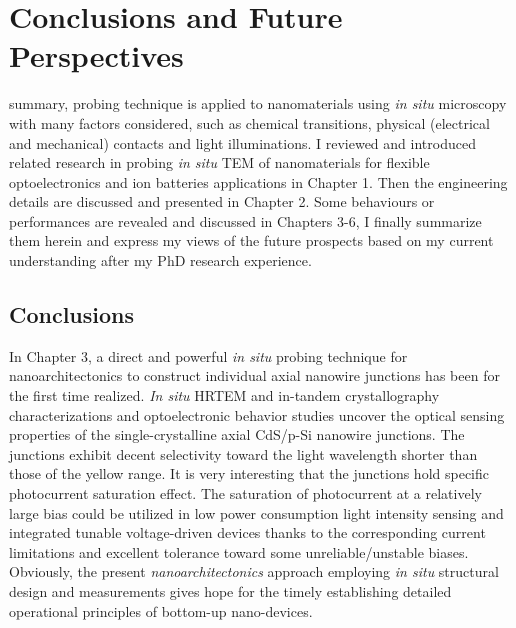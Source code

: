 

\chapter{Conclusions and Future Perspectives}

 summary, probing technique is applied to nanomaterials using \emph{in situ} microscopy with many factors considered, such as chemical transitions, physical (electrical and mechanical) contacts and light illuminations. 
I reviewed and introduced related research in probing {\it in situ} TEM of nanomaterials for flexible optoelectronics and ion batteries applications in Chapter 1. 
Then the engineering details are discussed and presented in Chapter 2. 
Some behaviours or performances are revealed and discussed in Chapters 3-6, I finally summarize them herein and express my views of the future prospects based on my current understanding after my PhD research experience. 

\section{Conclusions}
In Chapter 3, a direct and powerful {\it in situ} probing technique for nanoarchitectonics to construct individual axial nanowire junctions has been for the first time realized. 
{\it In situ} HRTEM and in-tandem crystallography characterizations and optoelectronic behavior studies uncover the optical sensing properties of the single-crystalline axial CdS/p-Si nanowire junctions. 
The junctions exhibit decent selectivity toward the light wavelength shorter than those of the yellow range. 
It is very interesting that the junctions hold specific photocurrent saturation effect. 
The saturation of photocurrent at a relatively large bias could be utilized in low power consumption light intensity sensing and integrated tunable voltage-driven devices thanks to the corresponding current limitations and excellent tolerance toward some unreliable/unstable biases. 
Obviously, the present {\it nanoarchitectonics} approach employing {\it in situ} structural design and measurements gives hope for the timely establishing detailed operational principles of bottom-up nano-devices. \\


